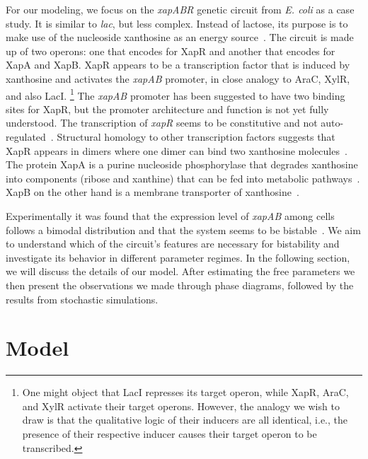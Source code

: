 \documentclass[10pt,letterpaper]{article}
\begin{document}
	For our modeling, we focus on the \emph{xapABR} genetic circuit from
	\emph{E. coli} as a case study. It is similar to \emph{lac}, but less
	complex. Instead of lactose, its purpose is to make use of the nucleoside
	xanthosine as an energy source~\cite{Buxton1980,Hammer-Jespersen1980}. The
	circuit is made up of two operons: one that encodes for XapR and another
	that encodes for XapA and XapB. XapR appears to be a transcription factor
	that is induced by xanthosine and activates the \emph{xapAB} promoter,
	in close analogy to AraC, XylR, and also LacI.
	\footnote{One might object that LacI represses its target operon, while
	XapR, AraC, and XylR activate their target operons. However, the analogy
	we wish to draw is that the qualitative logic of their inducers are all
	identical, i.e., the presence of their respective inducer causes their
	target operon to be transcribed.}
	The \textit{xapAB} promoter has been suggested to have two binding sites for XapR\cite{Seeger1995},
	but the promoter architecture and function is not yet fully understood. The
	transcription of \emph{xapR} seems to be constitutive and not
	auto-regulated~\cite{Seeger1995}. Structural homology to other transcription
	factors suggests that XapR appears in dimers where one dimer can bind two
	xanthosine molecules~\cite{Joergensen1999}. The protein XapA is a purine
	nucleoside phosphorylase that degrades xanthosine into components (ribose
	and xanthine) that can be fed into metabolic
	pathways~\cite{Buxton1980,Hammer-Jespersen1980}. XapB on the other hand is a
	membrane transporter of xanthosine~\cite{Seeger1995,Norholm2001}.
	
	Experimentally it was found that the expression level of \emph{xapAB} among
	cells follows a bimodal distribution and that the system seems to be
	bistable~\cite{Chure2019}. We aim to understand which of the circuit's
	features are necessary for bistability and investigate its behavior in
	different parameter regimes. In the following section, we will discuss the
	details of our model. After estimating the free parameters we then present
	the observations we made through phase diagrams, followed by the results
	from stochastic simulations.
	
	
	\section*{Model}
\end{document}
